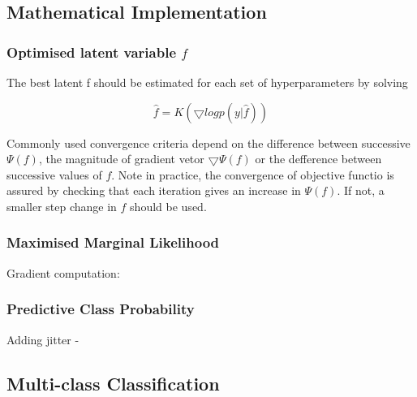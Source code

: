 \documentclass[11pt]{report}
\begin{document}
\subsection{Mathematical Implementation}
\space

\subsubsection{Optimised latent variable $f$}
The best latent f should be estimated for each set of hyperparameters by solving 

\[\hat{f} = K(\bigtriangledown logp(y|\hat{f}))\]

Commonly used convergence criteria depend on the difference between successive $\Psi (f)$, the magnitude of gradient vetor $\bigtriangledown\Psi (f)$ or the defference between successive values of $f$. Note in practice, the convergence of objective functio is assured by checking that each iteration gives an increase in $\Psi (f)$. If not, a smaller step change in $f$ should be used.


\subsubsection{Maximised Marginal Likelihood}

Gradient computation: 

\subsubsection{Predictive Class Probability}
Adding jitter -
\subsection{Multi-class Classification}
\end{document}
